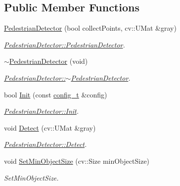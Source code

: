 \subsection*{Public Member Functions}
\begin{DoxyCompactItemize}
\item 
\mbox{\hyperlink{class_pedestrian_detector_afdf81621958b3bd7083a67c76a535e4a}{Pedestrian\+Detector}} (bool collect\+Points, cv\+::\+U\+Mat \&gray)
\begin{DoxyCompactList}\small\item\em \mbox{\hyperlink{class_pedestrian_detector_afdf81621958b3bd7083a67c76a535e4a}{Pedestrian\+Detector\+::\+Pedestrian\+Detector}}. \end{DoxyCompactList}\item 
\mbox{\hyperlink{class_pedestrian_detector_af093451952c64eb107ac2e2aff115b6c}{$\sim$\+Pedestrian\+Detector}} (void)
\begin{DoxyCompactList}\small\item\em \mbox{\hyperlink{class_pedestrian_detector_af093451952c64eb107ac2e2aff115b6c}{Pedestrian\+Detector\+::$\sim$\+Pedestrian\+Detector}}. \end{DoxyCompactList}\item 
bool \mbox{\hyperlink{class_pedestrian_detector_a630d8ad4d8ca2123639e989b01c8dd3e}{Init}} (const \mbox{\hyperlink{defines_8h_a81d657237a541d02f8eeefdd40191920}{config\+\_\+t}} \&config)
\begin{DoxyCompactList}\small\item\em \mbox{\hyperlink{class_pedestrian_detector_a630d8ad4d8ca2123639e989b01c8dd3e}{Pedestrian\+Detector\+::\+Init}}. \end{DoxyCompactList}\item 
void \mbox{\hyperlink{class_pedestrian_detector_a27a7c2c3b358f6e44a7de71f808597c2}{Detect}} (cv\+::\+U\+Mat \&gray)
\begin{DoxyCompactList}\small\item\em \mbox{\hyperlink{class_pedestrian_detector_a27a7c2c3b358f6e44a7de71f808597c2}{Pedestrian\+Detector\+::\+Detect}}. \end{DoxyCompactList}\item 
void \mbox{\hyperlink{class_base_detector_ab459f4e77cf1110cc1ee84027f0f2a03}{Set\+Min\+Object\+Size}} (cv\+::\+Size min\+Object\+Size)
\begin{DoxyCompactList}\small\item\em Set\+Min\+Object\+Size. \end{DoxyCompactList}\item 

\end{DoxyCompactItemize}

